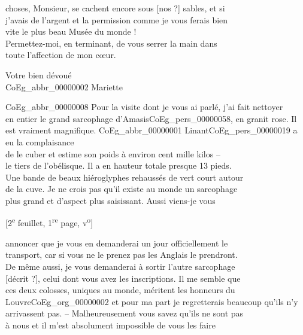 \documentclass{book}
\begin{document}
choses, Monsieur, se cachent encore sous [nos ?] sables, et si\\
j’avais de l’argent et la permission comme je vous ferais bien\\
vite le plus beau Musée du monde !\\
\indent Permettez-moi, en terminant, de vous serrer la main dans\\
toute l’affection de mon cœur.
\begin{center}\hspace{5cm} Votre bien dévoué\\
\hspace{5cm} \gls{CoEg_abbr_00000002} Mariette\end{center}
\gls{CoEg_abbr_00000008} Pour la visite dont je vous ai parlé, j’ai fait nettoyer\\
en entier le grand sarcophage d’Amasis\gls{CoEg_pers_00000058}, en granit rose. Il\\
est vraiment magnifique. \gls{CoEg_abbr_00000001} Linant\gls{CoEg_pers_00000019} a eu la complaisance\\
de le cuber et estime son poids à environ cent mille kilos –\\
le tiers de l’obélisque. Il a en hauteur totale presque 13 pieds.\\
Une bande de beaux hiéroglyphes rehaussés de vert court autour\\
de la cuve. Je ne crois pas qu’il existe au monde un sarcophage\\
plus grand et d’aspect plus saisissant. Aussi viens-je vous
{\footnotesize\begin{center} {[2\textsuperscript{e} feuillet, 1\textsuperscript{re} page, v\textsuperscript{o}]}\end{center}}
\noindent annoncer que je vous en demanderai un jour officiellement le\\
transport, car si vous ne le prenez pas les Anglais le prendront.\\
De même aussi, je vous demanderai à sortir l’autre sarcophage\\
{[décrit ?]}, celui dont vous avez les inscriptions. Il me semble que\\
ces deux colosses, uniques au monde, méritent les honneurs du\\
Louvre\gls{CoEg_org_00000002} et pour ma part je regretterais beaucoup qu’ils n’y\\
arrivassent pas. – Malheureusement vous savez qu’ils ne sont pas\\
à nous et il m’est absolument impossible de vous les faire\\
\end{document}
